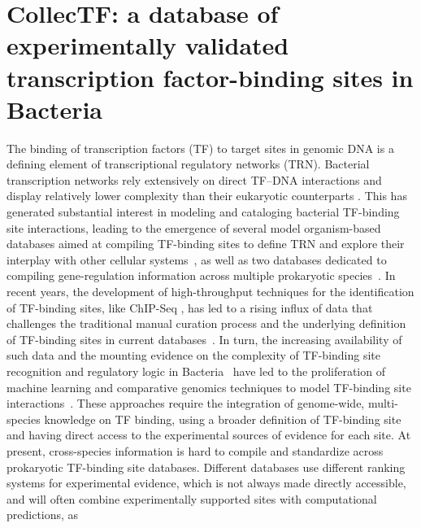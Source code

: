 

\chapter{CollecTF: a database of experimentally validated transcription
  factor-binding sites in Bacteria}
\label{chap:collectf}


The binding of transcription factors (TF) to target sites in genomic DNA is a
defining element of transcriptional regulatory networks (TRN). Bacterial
transcription networks rely extensively on direct TF–DNA interactions and
display relatively lower complexity than their eukaryotic counterparts
\citep{wunderlich2009different, remenyi2004combinatorial}. This has generated
substantial interest in modeling and cataloging bacterial TF-binding site
interactions, leading to the emergence of several model organism-based
databases aimed at compiling TF-binding sites to define TRN and explore their
interplay with other cellular systems~\citep{salgado2013regulondb,
  jacques2005mtbreglist, pauling2012coryneregnet, sierro2008dbtbs}, as well as
two databases dedicated to compiling gene-regulation information across
multiple prokaryotic species~\citep{munch2005virtual,
  kazakov2007regtransbase}. In recent years, the development of high-throughput
techniques for the identification of TF-binding sites, like ChIP-Seq
\citep{mardis2007chip}, has led to a rising influx of data that challenges the
traditional manual curation process and the underlying definition of TF-binding
sites in current databases~\citep{salgado2013regulondb}. In turn, the increasing
availability of such data and the mounting evidence on the complexity of
TF-binding site recognition and regulatory logic in
Bacteria~\citep{hijum2009mechanisms, paul2007integration, barnard2004regulation}
have led to the proliferation of machine learning and comparative genomics
techniques to model TF-binding site interactions~\citep{narlikar2013mumod,
  maienschein2012improved, zwir2005dissecting}. These approaches require the
integration of genome-wide, multi-species knowledge on TF binding, using a
broader definition of TF-binding site and having direct access to the
experimental sources of evidence for each site. At present, cross-species
information is hard to compile and standardize across prokaryotic TF-binding
site databases. Different databases use different ranking systems for
experimental evidence, which is not always made directly accessible, and will
often combine experimentally supported sites with computational predictions, as

